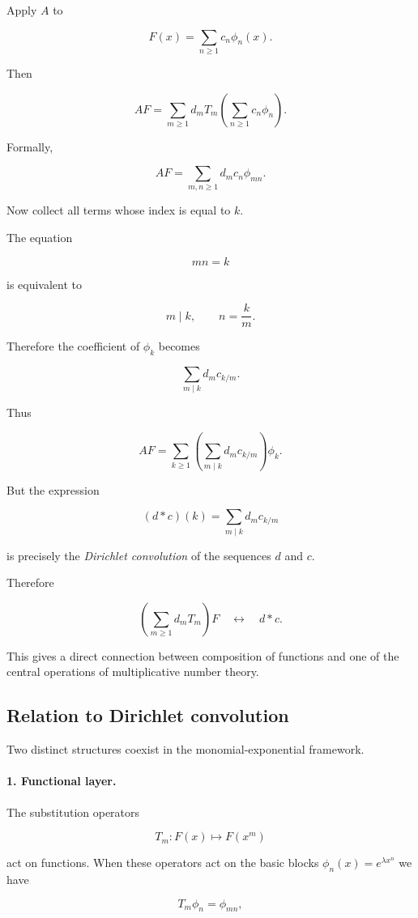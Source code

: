 Apply \(A\) to

\[
F(x)
=
\sum_{n\geq1}c_n\phi_n(x).
\]

Then

\[
AF
=
\sum_{m\geq1}
d_mT_m
\left(
\sum_{n\geq1}c_n\phi_n
\right).
\]

Formally,

\[
AF
=
\sum_{m,n\geq1}
d_mc_n\phi_{mn}.
\]

Now collect all terms whose index is equal to \(k\).

The equation

\[
mn=k
\]

is equivalent to

\[
m\mid k,
\qquad
n=\frac{k}{m}.
\]

Therefore the coefficient of \(\phi_k\) becomes

\[
\sum_{m\mid k}
d_m c_{k/m}.
\]

Thus

\[
\boxed{
AF
=
\sum_{k\geq1}
\left(
\sum_{m\mid k}
d_m c_{k/m}
\right)
\phi_k.
}
\]

But the expression

\[
(d*c)(k)
=
\sum_{m\mid k}
d_m c_{k/m}
\]

is precisely the \emph{Dirichlet convolution} of the sequences
\(d\) and \(c\).

Therefore

\[
\boxed{
\left(
\sum_{m\geq1}d_mT_m
\right)
F
\quad\longleftrightarrow\quad
d*c.
}
\]

This gives a direct connection between composition of functions and
one of the central operations of multiplicative number theory.

\subsection*{Relation to Dirichlet convolution}

Two distinct structures coexist in the monomial‑exponential framework.

\paragraph{1. Functional layer.}
The substitution operators


\[
T_m:F(x)\mapsto F(x^m)
\]


act on functions. When these operators act on the basic blocks
\(\phi_n(x)=e^{\lambda x^n}\) we have


\[
T_m\phi_n=\phi_{mn},
\]


